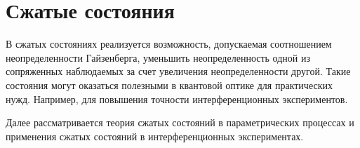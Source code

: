 \chapter{Сжатые состояния}
\label{chSqueezed}
В сжатых состояниях реализуется возможность, допускаемая соотношением
неопределенности Гайзенберга, уменьшить неопределенность одной из
сопряженных наблюдаемых за счет увеличения неопределенности другой.
Такие состояния могут оказаться полезными в квантовой оптике для
практических нужд. Например, для повышения точности интерференционных
экспериментов. 

Далее рассматривается теория сжатых состояний в параметрических
процессах и применения сжатых состояний в интерференционных
экспериментах. 










